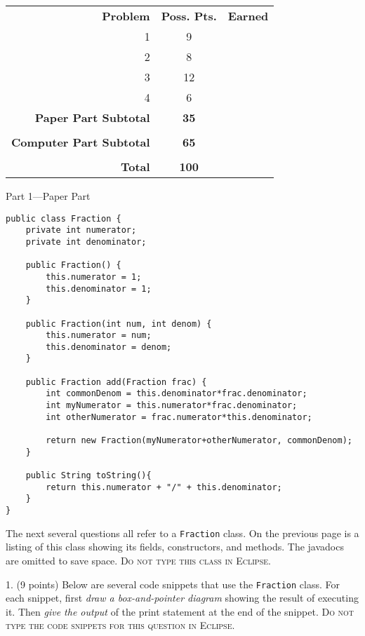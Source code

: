 \documentclass[12pt,twoside]{article}
\newcommand{\fillInBlank}[1][0.5in]{\underline{\hspace{#1}}}
\newcommand{\code}[1]{\texttt{#1}}
\begin{document}
\begin{flushright}
\begin{tabular}{rcc}
\textbf{Problem} & \textbf{Poss. Pts.} & \textbf{Earned} \\
1 & 9 & \fillInBlank \\
2 & 8 & \fillInBlank \\
3 & 12 & \fillInBlank \\
4 & 6 & \fillInBlank \\
\textbf{Paper Part Subtotal} & \textbf{35} & \fillInBlank\\
 & & \\
\textbf{Computer Part Subtotal} & \textbf{65} & \fillInBlank\\
 & & \\
\textbf{Total} & \textbf{100} & \fillInBlank
\end{tabular}
\end{flushright}
\clearpage

{\Large Part 1---Paper Part}

\begin{center}
\begin{minipage}[t]{0.9\linewidth}
\begin{lstlisting}
public class Fraction {
	private int numerator;
	private int denominator;

	public Fraction() {
		this.numerator = 1;
		this.denominator = 1;
	}

	public Fraction(int num, int denom) {
		this.numerator = num;
		this.denominator = denom;
	}

	public Fraction add(Fraction frac) {
		int commonDenom = this.denominator*frac.denominator;
		int myNumerator = this.numerator*frac.denominator;
		int otherNumerator = frac.numerator*this.denominator;
		
		return new Fraction(myNumerator+otherNumerator, commonDenom);
	}
	
	public String toString(){
		return this.numerator + "/" + this.denominator;
	}
}
\end{lstlisting}
\end{minipage}
\end{center}
\clearpage

The next several questions all refer to a \code{Fraction} class.  On the previous page is a listing of this class showing its fields, constructors, and methods.  The javadocs are omitted to save space. \textsc{Do not type this class in Eclipse}.

1. (9 points) Below are several code snippets that use the \code{Fraction} class.  For each snippet, first 
\emph{draw a box-and-pointer diagram} showing the result of executing it.  Then \emph{give the output} of the print statement at the end of the snippet. \textsc{Do not type the code snippets for this question in Eclipse}.
\end{document}
